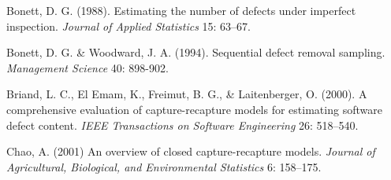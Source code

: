 \documentclass[a4paper,10pt,twoside]{article}
\begin{document}
{\begin{thebibliography}{3}
	
	
%	
	
%	
	Bonett, D. G. (1988). Estimating the number of defects under imperfect inspection. 
	{\em Journal of Applied Statistics} 15: 63--67.
	
	Bonett, D. G. \&  Woodward, J. A. (1994). Sequential defect removal sampling. {\em Management Science} 40: 898-902.‏
	
	Briand, L. C., El Emam, K., Freimut, B. G., \& Laitenberger, O. (2000). A comprehensive evaluation of capture-recapture models for estimating software defect content. {\em IEEE Transactions on Software Engineering} 26: 518--540.
	
	
	
%	
	Chao, A. (2001) An overview of closed capture-recapture models. {\em Journal of Agricultural, Biological, and Environmental Statistics} 6:  158--175.‏
	

\end{thebibliography}}
\end{document}

